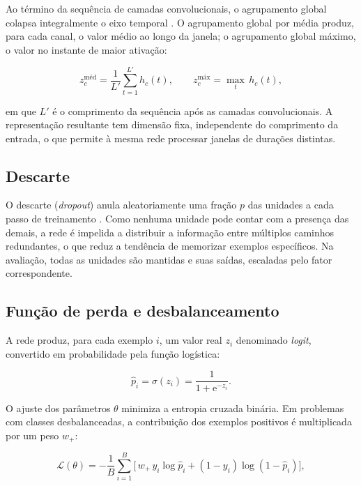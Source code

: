 Ao término da sequência de camadas convolucionais, o agrupamento global
colapsa integralmente o eixo temporal \cite{lin2014network}. O agrupamento
global por média produz, para cada canal, o valor médio ao longo da janela;
o agrupamento global máximo, o valor no instante de maior ativação:

\begin{equation}
	z_{c}^{\text{méd}} = \frac{1}{L'} \sum_{t=1}^{L'} h_{c}(t),
	\qquad
	z_{c}^{\text{máx}} = \max_{t} \, h_{c}(t),
	\label{eq:pooling-global}
\end{equation}

\noindent
em que $L'$ é o comprimento da sequência após as camadas convolucionais. A
representação resultante tem dimensão fixa, independente do comprimento da
entrada, o que permite à mesma rede processar janelas de durações distintas.

\subsection{Descarte}
\label{subsec:fund-dropout}

O descarte (\textit{dropout}) anula aleatoriamente uma fração $p$ das
unidades a cada passo de treinamento \cite{srivastava2014dropout}. Como
nenhuma unidade pode contar com a presença das demais, a rede é impelida a
distribuir a informação entre múltiplos caminhos redundantes, o que reduz a
tendência de memorizar exemplos específicos. Na avaliação, todas as unidades
são mantidas e suas saídas, escaladas pelo fator correspondente.

\subsection{Função de perda e desbalanceamento}
\label{subsec:fund-perda}

A rede produz, para cada exemplo $i$, um valor real $z_i$ denominado
\textit{logit}, convertido em probabilidade pela função logística:

\begin{equation}
	\hat{p}_i = \sigma(z_i) = \frac{1}{1 + \mathrm{e}^{-z_i}}.
	\label{eq:logistica}
\end{equation}

O ajuste dos parâmetros $\theta$ minimiza a entropia cruzada binária. Em
problemas com classes desbalanceadas, a contribuição dos exemplos positivos
é multiplicada por um peso $w_{+}$:

\begin{equation}
	\mathcal{L}(\theta) = -\frac{1}{B} \sum_{i=1}^{B}
	\Big[\, w_{+}\, y_i \log \hat{p}_i + (1 - y_i) \log(1 - \hat{p}_i) \Big],
	\label{eq:bce-ponderada}
\end{equation}

